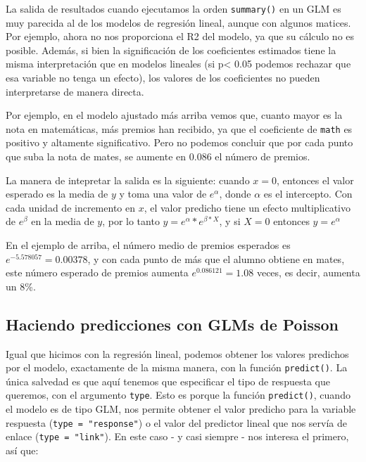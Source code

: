 \documentclass[
  letterpaper,
  DIV=11,
  numbers=noendperiod]{scrreprt}
\begin{document}
La salida de resultados cuando ejecutamos la orden \texttt{summary()} en
un GLM es muy parecida al de los modelos de regresión lineal, aunque con
algunos matices. Por ejemplo, ahora no nos proporciona el R2 del modelo,
ya que su cálculo no es posible. Además, si bien la significación de los
coeficientes estimados tiene la misma interpretación que en modelos
lineales (si p\textless{} 0.05 podemos rechazar que esa variable no
tenga un efecto), los valores de los coeficientes no pueden
interpretarse de manera directa.

Por ejemplo, en el modelo ajustado más arriba vemos que, cuanto mayor es
la nota en matemáticas, más premios han recibido, ya que el coeficiente
de \texttt{math} es positivo y altamente significativo. Pero no podemos
concluir que por cada punto que suba la nota de mates, se aumente en
0.086 el número de premios.

La manera de intepretar la salida es la siguiente: cuando \(x=0\),
entonces el valor esperado es la media de \(y\) y toma una valor de
\(e^\alpha\), donde \(\alpha\) es el intercepto. Con cada unidad de
incremento en \(x\), el valor predicho tiene un efecto multiplicativo de
\(e^\beta\) en la media de \(y\), por lo tanto
\(y=e^\alpha*e^{\beta*X}\), y si \(X = 0\) entonces \(y = e^\alpha\)

En el ejemplo de arriba, el número medio de premios esperados es
\(e^{-5.578057} = 0.00378\), y con cada punto de más que el alumno
obtiene en mates, este número esperado de premios aumenta
\(e^{0.086121} = 1.08\) veces, es decir, aumenta un 8\%.

\hypertarget{haciendo-predicciones-con-glms-de-poisson}{%
\subsection{Haciendo predicciones con GLMs de
Poisson}\label{haciendo-predicciones-con-glms-de-poisson}}

Igual que hicimos con la regresión lineal, podemos obtener los valores
predichos por el modelo, exactamente de la misma manera, con la función
\texttt{predict()}. La única salvedad es que aquí tenemos que
especificar el tipo de respuesta que queremos, con el argumento
\texttt{type}. Esto es porque la función \texttt{predict()}, cuando el
modelo es de tipo GLM, nos permite obtener el valor predicho para la
variable respuesta (\texttt{type\ =\ "response"}) o el valor del
predictor lineal que nos servía de enlace (\texttt{type\ =\ "link"}). En
este caso - y casi siempre - nos interesa el primero, así que:
\end{document}
